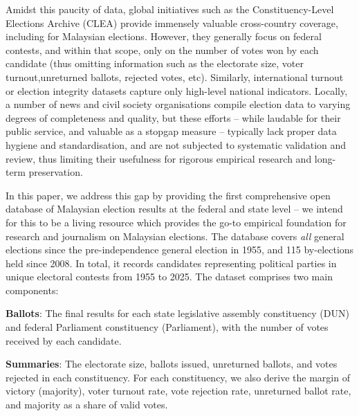 \documentclass[11pt]{article}
\begin{document}
Amidst this paucity of data, global initiatives such as the Constituency-Level Elections Archive (CLEA)\cite{clea} provide immensely valuable cross-country coverage, including for Malaysian elections. However, they generally focus on federal contests, and within that scope, only on the number of votes won by each candidate (thus omitting information such as the electorate size, voter turnout,unreturned ballots, rejected votes, etc). Similarly, international turnout or election integrity datasets\cite{icoma2023urnout,norris2014integrity} capture only high-level national indicators. Locally, a number of news and civil society organisations\cite{undiinfo,ge15sinar,tindakgithub} compile election data to varying degrees of completeness and quality, but these efforts -- while laudable for their public service, and valuable as a stopgap measure -- typically lack proper data hygiene and standardisation, and are not subjected to systematic validation and review, thus limiting their usefulness for rigorous empirical research and long-term preservation.

In this paper, we address this gap by providing the first comprehensive open database of Malaysian election results at the federal and state level -- we intend for this to be a living resource which provides the go-to empirical foundation for research and journalism on Malaysian elections. The database covers \textit{all} general elections since the pre-independence general election in 1955, and 115 by-elections held since 2008. In total, it records \TOTALBALLOTS\space candidates representing \TOTALPARTIES\space political parties in \TOTALCONTESTS\space unique electoral contests from 1955 to 2025. The dataset comprises two main components:
\begin{enumbul}
\item \textbf{Ballots}: The final results for each state legislative assembly constituency (DUN) and federal Parliament constituency (Parliament), with the number of votes received by each candidate.
\item \textbf{Summaries}: The electorate size, ballots issued, unreturned ballots, and votes rejected in each constituency. For each constituency, we also derive the margin of victory (majority), voter turnout rate, vote rejection rate, unreturned ballot rate, and majority as a share of valid votes.
\end{enumbul}
\end{document}
